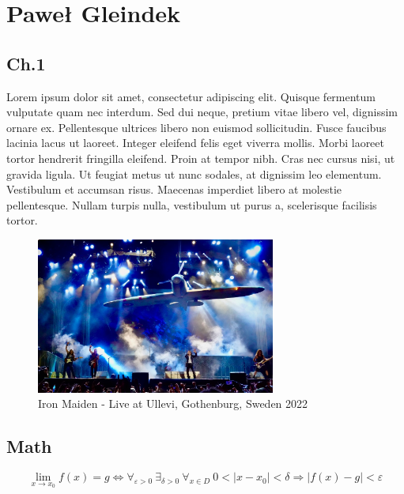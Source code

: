 \section{Paweł Gleindek}
\label{sec::gleindekp}

\subsection{Ch.1}
\begin{flushleft}
Lorem ipsum dolor sit amet, consectetur adipiscing elit. Quisque fermentum vulputate quam nec interdum. Sed dui neque, pretium vitae libero vel, dignissim ornare ex. Pellentesque ultrices libero non euismod sollicitudin. Fusce faucibus lacinia lacus ut laoreet. Integer eleifend felis eget viverra mollis. Morbi laoreet tortor hendrerit fringilla eleifend. Proin at tempor nibh. Cras nec cursus nisi, ut gravida ligula. Ut feugiat metus ut nunc sodales, at dignissim leo elementum. Vestibulum et accumsan risus. Maecenas imperdiet libero at molestie pellentesque. Nullam turpis nulla, vestibulum ut purus a, scelerisque facilisis tortor. 
\end{flushleft}

\begin{figure}[htbp]
    \centering
    \includegraphics[width=0.7\textwidth]{pictures/imlive.jpg} 
    \caption{Iron Maiden - Live at Ullevi, Gothenburg, Sweden 2022}
    \label{fig:ironm}
\end{figure}

\subsection{Math}
\begin{equation}
    \lim_{x\rightarrow x_0}f(x)=g \Leftrightarrow \forall _{\varepsilon>0}~\exists _{\delta >0} ~\forall _{x\in D} ~0<|x-x_0|< \delta \Rightarrow |f(x)-g|< \varepsilon 
\end{equation}

